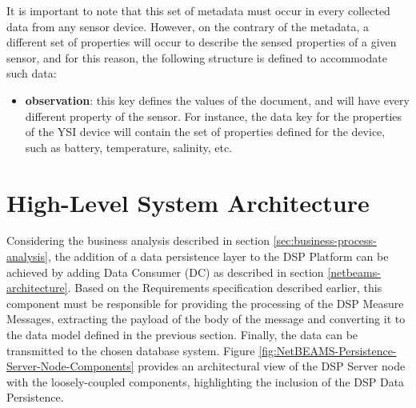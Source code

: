 It is important to note that this set of metadata must occur in every
collected data from any sensor device. However, on the contrary of the
metadata, a different set of properties will occur to describe the sensed
properties of a given sensor, and for this reason, the following structure is
defined to accommodate such data:

\begin{itemize}
  \item \textbf{observation}: this key defines the values of the document, and
  will have every different property of the sensor. For instance, the data key
  for the properties of the YSI device will contain the set of properties 
  defined for the device, such as battery, temperature, salinity, etc.
\end{itemize}

\section{High-Level System Architecture}

Considering the business analysis described in section
\ref{sec:business-process-analysis}, the addition of a data persistence layer
to the DSP Platform can be achieved by adding Data Consumer (DC) as described
in section \ref{netbeams-architecture}. Based on the Requirements
specification described earlier, this component must be responsible for
providing the processing of the DSP Measure Messages, extracting the payload of
the body of the message and converting it to the data model defined in the
previous section. Finally, the data can be transmitted to the chosen database
system. Figure \ref{fig:NetBEAMS-Persistence-Server-Node-Components} provides
an architectural view of the DSP Server node with the loosely-coupled
components, highlighting the inclusion of the DSP Data Persistence.

